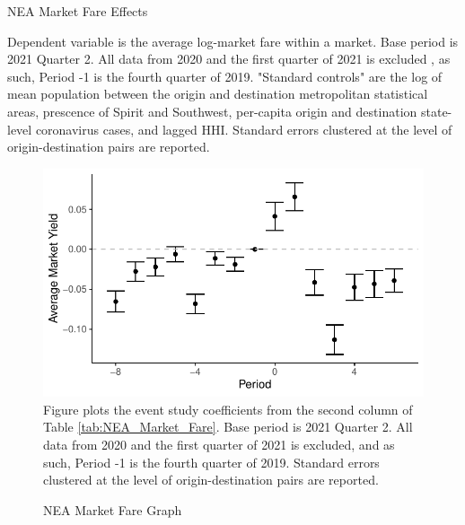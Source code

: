 \documentclass{article}
\begin{document}
\begin{appendices}
	\begin{table}
		\caption{NEA Market Fare Effects}
		\label{tab:NEA_Market_Fare}
		
		\footnotesize{Dependent variable is the average log-market fare within a market. Base period is 2021 Quarter 2. All data from 2020 and the first quarter of 2021 is excluded , as such,  Period -1 is the fourth quarter of 2019. "Standard controls" are the log of mean population between the origin and destination metropolitan statistical areas, prescence of Spirit and Southwest, per-capita origin and destination state-level coronavirus cases, and lagged HHI. Standard errors clustered at the level of origin-destination pairs are reported.  }
	\end{table}
	
	\begin{figure}
		\caption{NEA Market Fare Graph}
		\label{fig:NEA_Market_Fare}
		\includegraphics[width = \linewidth]{NEA_Market_Fare_Graph.pdf}
		\footnotesize{Figure plots the event study coefficients from the second column of Table \ref{tab:NEA_Market_Fare}. Base period is 2021 Quarter 2. All data from 2020 and the first quarter of 2021 is excluded, and as such, Period -1 is the fourth quarter of 2019. Standard errors clustered at the level of origin-destination pairs are reported. }
	\end{figure}
	

\end{appendices}
\end{document}
